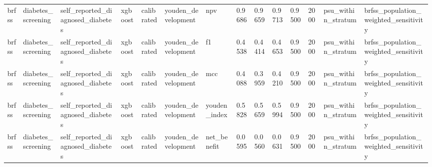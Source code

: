 \begin{tabular}{llllllllllllll}
brfss & diabetes\_screening & self\_reported\_diagnosed\_diabetes & xgboost & calibrated & youden\_development & npv & 0.9686 & 0.9659 & 0.9713 & 0.9500 & 2000 & psu\_within\_stratum & brfss\_population\_weighted\_sensitivity \\
brfss & diabetes\_screening & self\_reported\_diagnosed\_diabetes & xgboost & calibrated & youden\_development & f1 & 0.4538 & 0.4414 & 0.4653 & 0.9500 & 2000 & psu\_within\_stratum & brfss\_population\_weighted\_sensitivity \\
brfss & diabetes\_screening & self\_reported\_diagnosed\_diabetes & xgboost & calibrated & youden\_development & mcc & 0.4088 & 0.3959 & 0.4210 & 0.9500 & 2000 & psu\_within\_stratum & brfss\_population\_weighted\_sensitivity \\
brfss & diabetes\_screening & self\_reported\_diagnosed\_diabetes & xgboost & calibrated & youden\_development & youden\_index & 0.5828 & 0.5659 & 0.5994 & 0.9500 & 2000 & psu\_within\_stratum & brfss\_population\_weighted\_sensitivity \\
brfss & diabetes\_screening & self\_reported\_diagnosed\_diabetes & xgboost & calibrated & youden\_development & net\_benefit & 0.0595 & 0.0560 & 0.0631 & 0.9500 & 2000 & psu\_within\_stratum & brfss\_population\_weighted\_sensitivity \\
\hline
\end{tabular}
